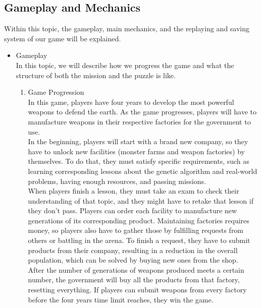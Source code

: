 \documentclass[12pt,oneside,openright,a4paper]{cpe-english-project}
\begin{document}
\subsection{Gameplay and Mechanics}
Within this topic, the gameplay, main mechanics, and the replaying and saving system of our game will be explained.

\begin{itemize}
\item Gameplay \\
In this topic, we will describe how we progress the game and what the structure of both the mission and the puzzle is like.
	\begin{enumerate}
	\item Game Progression \\
	In this game, players have four years to develop the most powerful weapons to defend the earth. As the game progresses, players will have to manufacture weapons in their respective factories for the government to use. \\
	In the beginning, players will start with a brand new company, so they have to unlock new facilities (monster farms and weapon factories) by themselves. To do that, they must satisfy specific requirements, such as learning corresponding lessons about the genetic algorithm and real-world problems, having enough resources, and passing missions. \\
	When players finish a lesson, they must take an exam to check their understanding of that topic, and they might have to retake that lesson if they don't pass. Players can order each facility to manufacture new generations of its corresponding product.
Maintaining factories requires money, so players also have to gather those by fulfilling requests from others or battling in the arena. To finish a request, they have to submit products from their company, resulting in a reduction in the overall population, which can be solved by buying new ones from the shop.\\
	After the number of generations of weapons produced meets a certain number, the government will buy all the products from that factory, resetting everything. If players can submit weapons from every factory before the four years time limit reaches, they win the game.


\end{enumerate}
\end{itemize}
\end{document}
